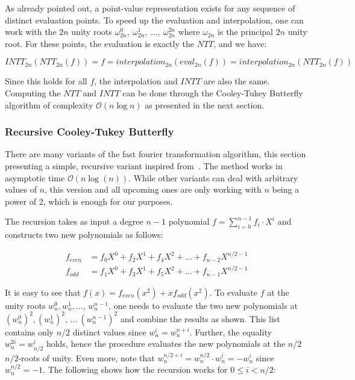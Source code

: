 As already pointed out, a point-value representation exists for any sequence of distinct evaluation points. To speed up the evaluation and interpolation, one can work with the $2n$ unity roots $\omega_{2n}^0,\ \omega_{2n}^1,\ \ldots,\ \omega_{2n}^{2n}$ where $\omega_{2n}$ is the principal $2n$ unity root. For these points, the evaluation is exactly the $NTT$, and we have:

\begin{equation*}
    INTT_{2n}(NTT_{2n}(f)) = f = interpolation_{2n}(eval_{2n}(f)) = interpolation_{2n}(NTT_{2n}(f)) 
\end{equation*}

Since this holds for all $f$, the interpolation and $INTT$ are also the same. Computing the $NTT$ and $INTT$ can be done through the Cooley-Tukey Butterfly algorithm of complexity $\mathcal{O}(n \log n)$ as presented in the next section.

\subsubsection{Recursive Cooley-Tukey Butterfly}

There are many variants of the fast fourier transformation algorithm, this section presenting a simple, recursive variant inspired from~\parencite{10.5555/1614191}. The method works in asymptotic time $\mathcal{O}(n \log(n))$. While other variants can deal with arbitrary values of $n$, this version and all upcoming ones are only working with $n$ being a power of 2, which is enough for our purposes.

The recursion takes as input a degree $n-1$ polynomial $f = \sum_{i=0}^{n-1} f_i \cdot X^i$ and constructs two new polynomials as follows:

\begin{align*}
    f_{even} &= f_0 X^0 + f_2 X^1 + f_4 X^2 + \ldots + f_{n-2} X^{n/2-1} \\
    f_{odd} &= f_1 X^0 + f_3 X^1 + f_5 X^2 + \ldots + f_{n-1} X^{n/2-1} 
\end{align*}

It is easy to see that $f(x) = f_{even}(x^2) + x f_{odd}(x^2)$. To evaluate $f$ at the unity roots $w_n^0, w_n^1, \ldots$, $w_n^{n-1}$, one needs to evaluate the two new polynomials at $(w_n^0)^2, (w_n^1)^2$, $\ldots\ (w_n^{n-1})^2$ and combine the results as shown. This list contains only $n/2$ distinct values since $w_n^i = w_n^{n+i}$. Further, the equality $w_n^{2i} = w_{n/2}^i$ holds, hence the procedure evaluates the new polynomials at the $n/2$ $n/2$-roots of unity. Even more, note that $w_n^{n/2 + i} = w_n^{n/2} \cdot w_n^i = - w_n^i$ since $w_n^{n/2} = -1$. The following shows how the recursion works for $0 \leq i < n/2$:

